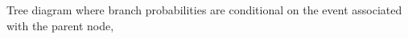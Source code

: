 \label{fig:condprob}
Tree diagram where branch probabilities are conditional on the event associated with the parent node, \cite{Brase2012}